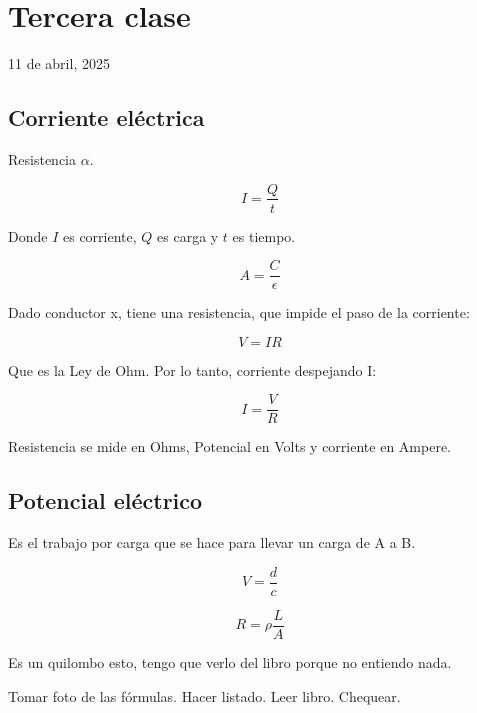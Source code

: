 \section{Tercera clase}

11 de abril, 2025

\subsection{Corriente eléctrica}

Resistencia \(\alpha\).

\begin{equation*}
    I = \frac{Q}{t}
\end{equation*}

Donde \(I\) es corriente,
\(Q\) es carga
y \(t\) es tiempo.

\begin{equation*}
    A = \frac{C}{\epsilon}
\end{equation*}

Dado conductor x,
tiene una resistencia,
que impide el paso de la corriente:

\begin{equation*}
    V = IR
\end{equation*}

Que es la Ley de Ohm.
Por lo tanto, corriente despejando I:

\begin{equation*}
    I = \frac{V}{R}
\end{equation*}

Resistencia se mide en Ohms,
Potencial en Volts
y corriente en Ampere.

\subsection{Potencial eléctrico}

Es el trabajo por carga que se hace para llevar un carga de A a B.

\begin{equation*}
    V = \frac{d}{c}
\end{equation*}

\begin{equation*}
    R = \rho\frac{L}{A}
\end{equation*}

Es un quilombo esto, tengo que verlo del libro porque no entiendo nada.

Tomar foto de las fórmulas.
Hacer listado.
Leer libro.
Chequear.